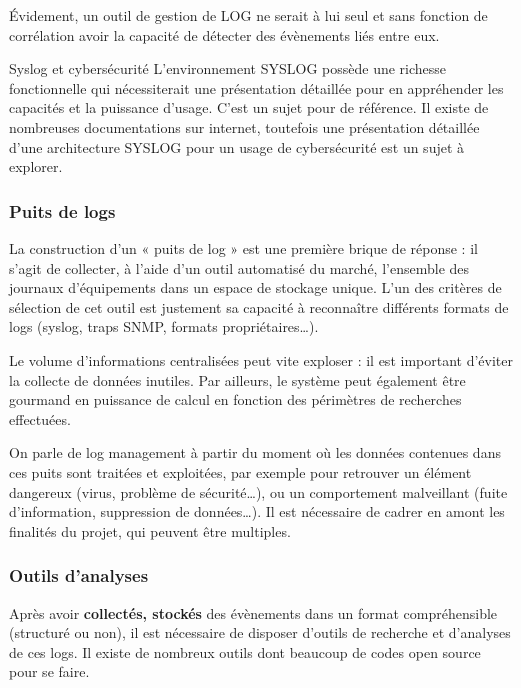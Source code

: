  Évidement, un outil de gestion de LOG ne serait à lui seul et sans fonction de corrélation avoir la capacité de détecter des évènements liés entre eux. 
 
\begin{techworkbox}{Syslog et cybersécurité}
	L'environnement SYSLOG possède une richesse fonctionnelle qui nécessiterait une présentation détaillée pour en appréhender les capacités et la puissance d'usage. C'est un sujet pour \fichetech de référence. Il existe de nombreuses documentations sur internet, toutefois une présentation détaillée d'une architecture SYSLOG pour un usage de cybersécurité est un sujet à explorer. 
\end{techworkbox}

\subsubsection{Puits de logs}

La construction d’un « puits de log » est une première brique de réponse : il s’agit de collecter, à l’aide d’un outil automatisé du marché, l’ensemble des journaux d’équipements dans un espace de stockage unique. L’un des critères de sélection de cet outil est justement sa capacité à reconnaître différents formats de logs (syslog, traps SNMP, formats propriétaires…).

Le volume d’informations centralisées peut vite exploser : il est important d’éviter la collecte de données inutiles. Par ailleurs, le système peut également être gourmand en puissance de calcul en fonction des périmètres de recherches effectuées.

On parle de log management à partir du moment où les données contenues dans ces  puits sont traitées et exploitées, par exemple pour retrouver un élément dangereux (virus, problème de sécurité…), ou un comportement malveillant (fuite d’information, suppression de données…). Il est nécessaire de cadrer en amont les finalités du projet,  qui peuvent être multiples.

\subsubsection{Outils d'analyses}

Après avoir \textbf{collectés, stockés} des évènements dans un format compréhensible (structuré ou non), il est nécessaire de disposer d'outils de recherche et d'analyses de ces logs. Il existe de nombreux outils  dont beaucoup de codes open source pour se faire.



